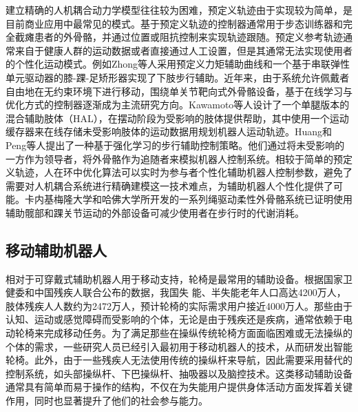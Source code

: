 建立精确的人机耦合动力学模型往往较为困难，预定义轨迹由于实现较为简单，是目前商业应用中最常见的模式。基于预定义轨迹的控制器通常用于步态训练器和完全截瘫患者的外骨骼，并通过位置或阻抗控制来实现轨迹跟随。预定义参考轨迹通常来自于健康人群的运动数据或者直接通过人工设置，但是其通常无法实现使用者的个性化运动模式。例如Zhong等人\cite{zhongGaitSymmetryEnhancement2022}采用预定义力矩辅助曲线和一个基于串联弹性单元驱动器的膝-踝-足矫形器实现了下肢步行辅助。近年来，由于系统允许佩戴者自由地在无约束环境下进行移动，围绕单关节靶向式外骨骼设备，基于在线学习与优化方式的控制器逐渐成为主流研究方向。Kawamoto等人\cite{kawamotoModificationHemiplegicCompensatory2015,kawamotoDevelopmentAssistController2014a}设计了一个单腿版本的混合辅助肢体（HAL），在摆动阶段为受影响的肢体提供帮助，其中使用一个运动缓存器来在线存储未受影响肢体的运动数据用规划机器人运动轨迹。Huang和Peng等人\cite{huangLearningbasedWalkingAssistance2018,pengDataDrivenReinforcementLearning2020}提出了一种基于强化学习的步行辅助控制策略。他们通过将未受影响的一方作为领导者，将外骨骼作为追随者来模拟机器人控制系统。相较于简单的预定义轨迹，人在环中优化算法可以实时为参与者个性化辅助机器人控制参数，避免了需要对人机耦合系统进行精确建模这一技术难点，为辅助机器人个性化提供了可能。卡内基梅隆大学和哈佛大学\cite{dingHumanintheloopOptimizationHip2018,zhangHumanintheloopOptimizationExoskeleton2017a,awadSoftRoboticExosuit2017}所开发的一系列绳驱动柔性外骨骼系统已证明使用辅助髋部和踝关节运动的外部设备可减少使用者在步行时的代谢消耗。

\subsection{移动辅助机器人}
相对于可穿戴式辅助机器人用于移动支持，轮椅是最常用的辅助设备\cite{worldhealthorganizationGuidelinesProvisionManual2008b}。根据国家卫健委和中国残疾人联合公布的数据，我国失
能、半失能老年人口高达4200万人，肢体残疾人人数约为2472万人，预计轮椅的实际需求用户接近4000万人。那些由于认知、运动或感觉障碍而受影响的个体，无论是由于残疾还是疾病，通常依赖于电动轮椅来完成移动任务。为了满足那些在操纵传统轮椅方面面临困难或无法操纵的个体的需求，一些研究人员已经引入最初用于移动机器人的技术，从而研发出智能轮椅。此外，由于一些残疾人无法使用传统的操纵杆来导航，因此需要采用替代的控制系统，如头部操纵杆、下巴操纵杆、抽吸器以及脑控技术\cite{kimLiteratureReviewSmart2023,carringtonWearablesChairablesInclusive2014,rulikControlWheelchairMounted6DOF2022}。这类移动辅助设备通常具有简单而易于操作的结构，不仅在为失能用户提供身体活动方面发挥着关键作用，同时也显著提升了他们的社会参与能力。

